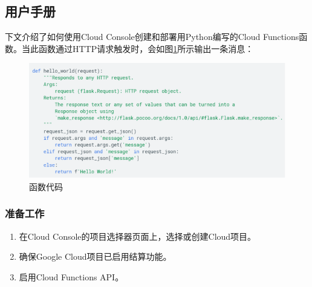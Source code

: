 \documentclass[11pt]{article}
\begin{document}
\subsection{用户手册}	
下文介绍了如何使用Cloud Console创建和部署用Python编写的Cloud Functions函数。当此函数通过HTTP请求触发时，会如图\ref{fig14}所示输出一条消息：

\begin{figure}[h]	
	\centering
	\includegraphics[scale=0.6]{figs/14.png}
	\caption{函数代码}
	\label{fig14}	
\end{figure}	

\subsubsection{准备工作}
\begin{enumerate}
	\item 在Cloud Console的项目选择器页面上，选择或创建Cloud项目。
	\item 确保Google Cloud项目已启用结算功能。
	\item 启用Cloud Functions API。
\end{enumerate}	
\end{document}
